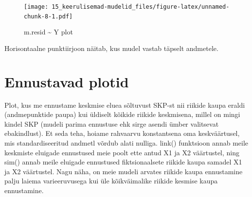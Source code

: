 \documentclass[]{book}
\newenvironment{Shaded}{\begin{snugshade}}{\end{snugshade}}
\newcommand{\DataTypeTok}[1]{\textcolor[rgb]{0.13,0.29,0.53}{#1}}
\newcommand{\DecValTok}[1]{\textcolor[rgb]{0.00,0.00,0.81}{#1}}
\newcommand{\KeywordTok}[1]{\textcolor[rgb]{0.13,0.29,0.53}{\textbf{#1}}}
\newcommand{\NormalTok}[1]{#1}
\newcommand{\OperatorTok}[1]{\textcolor[rgb]{0.81,0.36,0.00}{\textbf{#1}}}
\newcommand{\OtherTok}[1]{\textcolor[rgb]{0.56,0.35,0.01}{#1}}
\newcommand{\StringTok}[1]{\textcolor[rgb]{0.31,0.60,0.02}{#1}}
\begin{document}
\begin{Shaded}
\end{Shaded}

\begin{figure}
\centering
\texttt{[image: 15\_keerulisemad-mudelid\_files/figure-latex/unnamed-chunk-8-1.pdf]}
\caption{\label{fig:unnamed-chunk-8}m.resid \textasciitilde{} Y plot}
\end{figure}

Horisontaalne punktiirjoon näitab, kus mudel vastab täpselt andmetele.

\hypertarget{ennustavad-plotid}{%
\section*{Ennustavad plotid}\label{ennustavad-plotid}}

Plot, kus me ennustame keskmise eluea sõltuvust SKP-st nii riikide kaupa eraldi (andmepunktide paupa) kui üldiselt kõikide riikide keskmisena, millel on mingi kindel SKP (mudeli parima ennustuse ehk sirge asendi ümber valitsevat ebakindlust). Et seda teha, hoiame rahvaarvu konstantsena oma keskväärtusel, mis standardiseeritud andmetl võrdub alati nulliga. link() funktsioon annab meile keskmiste eluigade ennustused meie poolt ette antud X1 ja X2 väärtustel, ning sim() annab meile eluigade ennustused fiktsionaalsete riikide kaupa samadel X1 ja X2 väärtustel. Nagu näha, on meie mudeli arvates riikide kaupa ennustamine palju laiema varieeruvusega kui üle kõikväimalike riikide kesmise kaupa ennustamine.
\end{document}

